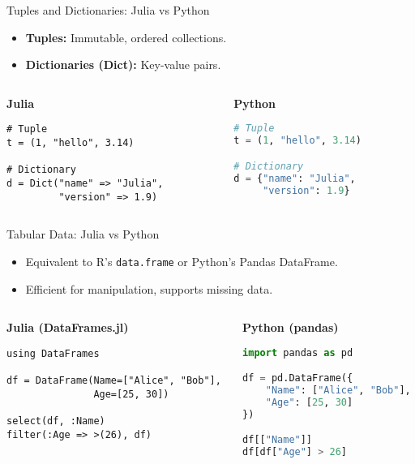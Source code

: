 \documentclass{beamer}
\begin{document}
\begin{frame}[fragile]{Tuples and Dictionaries: Julia vs Python}
\begin{itemize}
    \item \textbf{Tuples:} Immutable, ordered collections.
    \item \textbf{Dictionaries (Dict):} Key-value pairs.
\end{itemize}

\vspace{0.3cm}
\begin{columns}
    \begin{column}{0.48\textwidth}
    \textbf{Julia}
    \begin{lstlisting}
# Tuple
t = (1, "hello", 3.14)

# Dictionary
d = Dict("name" => "Julia",
         "version" => 1.9)
    \end{lstlisting}
    \end{column}

    \begin{column}{0.48\textwidth}
    \textbf{Python}
    \begin{lstlisting}[language=Python]
# Tuple
t = (1, "hello", 3.14)

# Dictionary
d = {"name": "Julia",
     "version": 1.9}
    \end{lstlisting}
    \end{column}
\end{columns}
\end{frame}

\begin{frame}[fragile]{Tabular Data: Julia vs Python}
\begin{itemize}
    \item Equivalent to R’s \texttt{data.frame} or Python’s Pandas DataFrame.
    \item Efficient for manipulation, supports missing data.
\end{itemize}

\vspace{0.3cm}
\begin{columns}
    \begin{column}{0.48\textwidth}
    \textbf{Julia (DataFrames.jl)}
    \begin{lstlisting}
using DataFrames

df = DataFrame(Name=["Alice", "Bob"],
               Age=[25, 30])

select(df, :Name)
filter(:Age => >(26), df)
    \end{lstlisting}
    \end{column}

    \begin{column}{0.48\textwidth}
    \textbf{Python (pandas)}
    \begin{lstlisting}[language=Python]
import pandas as pd

df = pd.DataFrame({
    "Name": ["Alice", "Bob"],
    "Age": [25, 30]
})

df[["Name"]]
df[df["Age"] > 26]
    \end{lstlisting}
    \end{column}
\end{columns}
\end{frame}
\end{document}
